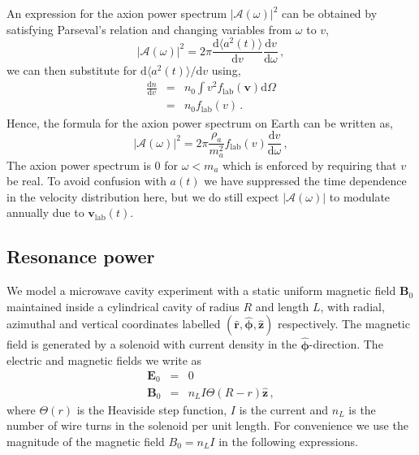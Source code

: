 An expression for the axion power spectrum $|\mathcal{A}(\omega)|^2$  can be obtained by satisfying Parseval's relation and changing variables from $\omega$ to $v$,
\begin{equation}
|\mathcal{A}(\omega)|^2 = 2\pi \frac{\textrm{d}\langle a^2(t) \rangle}{\textrm{d}v}\frac{\textrm{d}v}{\textrm{d}\omega} \, ,
\end{equation}
we can then substitute for $\textrm{d}\langle a^2(t) \rangle /\textrm{d}v$ using,
\begin{eqnarray}
 \frac{\textrm{d}n}{\textrm{d}v} &=& n_0 \int v^2 f_\textrm{lab}(\textbf{v}) \textrm{d}\Omega \\
  &=& n_0 f_\textrm{lab}(v) \, .
\end{eqnarray}
Hence, the formula for the axion power spectrum on Earth can be written as,
\begin{equation}\label{eq:Asqlab}
|\mathcal{A}(\omega)|^2 = 2\pi \frac{\rho_a}{m_a^2} f_\textrm{lab}(v)\frac{\textrm{d}v}{\textrm{d}\omega} \, ,
\end{equation}
The axion power spectrum is 0 for $\omega<m_a$ which is enforced by requiring that $v$ be real. To avoid confusion with $a(t)$ we have suppressed the time dependence in the velocity distribution here, but we do still expect $|\mathcal{A}(\omega)|$ to modulate annually due to $\textbf{v}_\textrm{lab}(t)$.


\subsection{Resonance power}\label{sec:axions_experiment}
We model a microwave cavity experiment with a static uniform magnetic field $\textbf{B}_0$ maintained inside a cylindrical cavity of radius $R$ and length $L$, with radial, azimuthal and vertical coordinates labelled $(\hat{\textbf{r}},\boldsymbol{\hat{\phi}},\hat{\textbf{z}})$ respectively. The magnetic field is generated by a solenoid with current density in the $\boldsymbol{\hat{\phi}}$-direction. The electric and magnetic fields we write as
\begin{eqnarray}
  \textbf{E}_0 &=& 0 \\
  \textbf{B}_0 &=& n_L I \Theta (R-r)\hat{\textbf{z}} \, ,
\end{eqnarray}
where $\Theta(r)$ is the Heaviside step function, $I$ is the current and $n_L$ is the number of wire turns in the solenoid per unit length. For convenience we use the magnitude of the magnetic field $B_0 = n_L I$ in the following expressions. 

